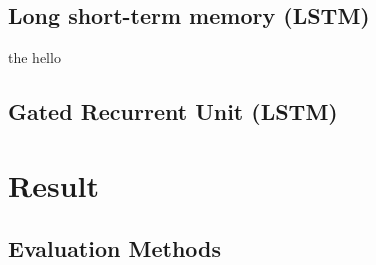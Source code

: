 \documentclass{ieeeojies}
\begin{document}
\subsection{Long short-term memory (LSTM)}
the hello 
\subsection{Gated Recurrent Unit (LSTM)}




\section{Result}
\subsection{Evaluation Methods}
\end{document}
